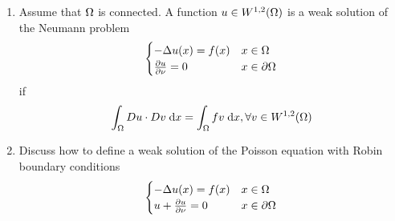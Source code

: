 \begin{enumerate}
  \item Assume that $\Omega$ is connected.
  A function $u \in W^{1, 2}(\Omega)$ is a weak solution of the Neumann problem
  $$
  \begin{cases}
    -\Delta u(x) = f(x) & x \in \Omega\\
    \frac{\partial u}{\partial \nu} = 0 & x \in \partial \Omega
  \end{cases}
  $$
  if
  $$
  \int_{\Omega} D u \cdot D v \;\mathrm{d}x = \int_{\Omega} f v \;\mathrm{d}x, \forall v \in W^{1, 2}(\Omega)
  $$

  \item Discuss how to define a weak solution of the Poisson equation with Robin boundary conditions
  $$
  \begin{cases}
    -\Delta u(x) = f(x) & x \in \Omega\\
    u + \frac{\partial u}{\partial \nu} = 0 & x \in \partial \Omega
  \end{cases}
  $$

\end{enumerate}
